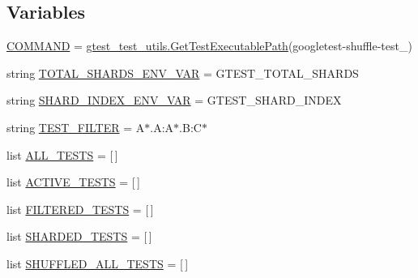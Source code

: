 \subsection*{Variables}
\begin{DoxyCompactItemize}
\item 
\mbox{\hyperlink{namespacegoogletest_1_1test_1_1googletest-shuffle-test_a999d0029c3b50bb490931da3d77e478d}{C\+O\+M\+M\+A\+ND}} = \mbox{\hyperlink{namespacegoogletest_1_1test_1_1gtest__test__utils_ac9af888c702350aac56b154a6af34098}{gtest\+\_\+test\+\_\+utils.\+Get\+Test\+Executable\+Path}}(\textquotesingle{}googletest-\/shuffle-\/test\+\_\+\textquotesingle{})
\item 
string \mbox{\hyperlink{namespacegoogletest_1_1test_1_1googletest-shuffle-test_abbd179bd03d87366ae9dd0e10407e71d}{T\+O\+T\+A\+L\+\_\+\+S\+H\+A\+R\+D\+S\+\_\+\+E\+N\+V\+\_\+\+V\+AR}} = \textquotesingle{}G\+T\+E\+S\+T\+\_\+\+T\+O\+T\+A\+L\+\_\+\+S\+H\+A\+R\+DS\textquotesingle{}
\item 
string \mbox{\hyperlink{namespacegoogletest_1_1test_1_1googletest-shuffle-test_affe4f2d4c0877dbd03096245be6709c6}{S\+H\+A\+R\+D\+\_\+\+I\+N\+D\+E\+X\+\_\+\+E\+N\+V\+\_\+\+V\+AR}} = \textquotesingle{}G\+T\+E\+S\+T\+\_\+\+S\+H\+A\+R\+D\+\_\+\+I\+N\+D\+EX\textquotesingle{}
\item 
string \mbox{\hyperlink{namespacegoogletest_1_1test_1_1googletest-shuffle-test_a13e324173efc23728cfb835e208540a7}{T\+E\+S\+T\+\_\+\+F\+I\+L\+T\+ER}} = \textquotesingle{}A$\ast$.A\+:A$\ast$.B\+:C$\ast$\textquotesingle{}
\item 
list \mbox{\hyperlink{namespacegoogletest_1_1test_1_1googletest-shuffle-test_a3790ffa0e946e4bcb48b36e65d6f3431}{A\+L\+L\+\_\+\+T\+E\+S\+TS}} = \mbox{[}$\,$\mbox{]}
\item 
list \mbox{\hyperlink{namespacegoogletest_1_1test_1_1googletest-shuffle-test_aeca74d9ae23c774f35eeea56237cd308}{A\+C\+T\+I\+V\+E\+\_\+\+T\+E\+S\+TS}} = \mbox{[}$\,$\mbox{]}
\item 
list \mbox{\hyperlink{namespacegoogletest_1_1test_1_1googletest-shuffle-test_a31d1bba61e47d93b9e80fb4b123f4812}{F\+I\+L\+T\+E\+R\+E\+D\+\_\+\+T\+E\+S\+TS}} = \mbox{[}$\,$\mbox{]}
\item 
list \mbox{\hyperlink{namespacegoogletest_1_1test_1_1googletest-shuffle-test_a67455405b69cbd94dd861f63e89cb319}{S\+H\+A\+R\+D\+E\+D\+\_\+\+T\+E\+S\+TS}} = \mbox{[}$\,$\mbox{]}
\item 
list \mbox{\hyperlink{namespacegoogletest_1_1test_1_1googletest-shuffle-test_ab9eda0e756f057b5bd784cd35abe9a11}{S\+H\+U\+F\+F\+L\+E\+D\+\_\+\+A\+L\+L\+\_\+\+T\+E\+S\+TS}} = \mbox{[}$\,$\mbox{]}

\end{DoxyCompactItemize}
